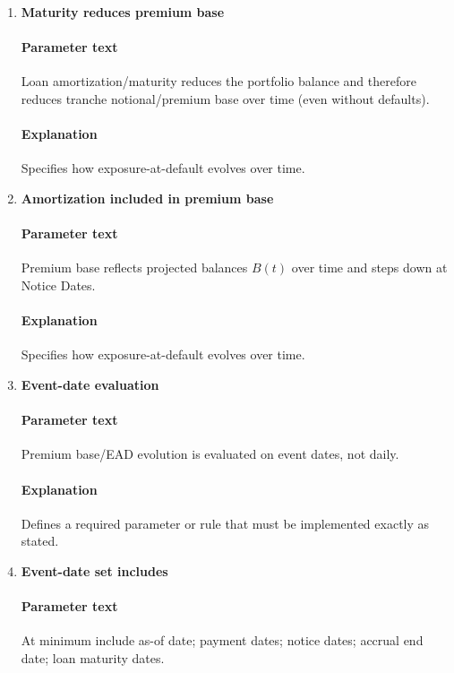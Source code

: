 \documentclass[11pt]{article}
\begin{document}
\begin{enumerate}[label=\arabic*),leftmargin=*,align=left]
\paragraph{Explanation} Specifies when a simulated default becomes economically effective.

\item \textbf{Maturity reduces premium base}
\paragraph{Parameter text} Loan amortization/maturity reduces the portfolio balance and therefore reduces tranche notional/premium base over time (even without defaults).
\paragraph{Explanation} Specifies how exposure-at-default evolves over time.

\item \textbf{Amortization included in premium base}
\paragraph{Parameter text} Premium base reflects projected balances $B(t)$ over time and steps down at Notice Dates.
\paragraph{Explanation} Specifies how exposure-at-default evolves over time.

\item \textbf{Event-date evaluation}
\paragraph{Parameter text} Premium base/EAD evolution is evaluated on event dates, not daily.
\paragraph{Explanation} Defines a required parameter or rule that must be implemented exactly as stated.

\item \textbf{Event-date set includes}
\paragraph{Parameter text} At minimum include as-of date; payment dates; notice dates; accrual end date; loan maturity dates.

\end{enumerate}
\end{document}
